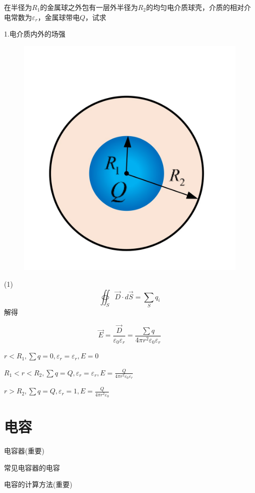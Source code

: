 \documentclass[lang=cn,10pt]{elegantbook}
\begin{document}
		\begin{example}
			在半径为$R_{1}$的金属球之外包有一层外半径为$R_{2}$的均匀电介质球壳，介质的相对介电常数为$\varepsilon_{r}$，金属球带电$Q$，试求
			
			1.电介质内外的场强
			
\begin{figure}[H]
	\centering
	\includegraphics[width=0.18\linewidth]{image/IMG_0418(20231118-125659)}
	\caption{}
	\label{fig:img041820231118-125659}
\end{figure}
		\end{example}
		 \begin{solution}
		 	
		 	(1)
		 	\begin{equation*}
		 		\oiint_S{\overrightarrow{D}\cdot d\overrightarrow{S}}=\sum_S{q_i}
		 	\end{equation*}
		 	解得
		 	
		 	\begin{equation*}
		 		\overrightarrow{E}=\frac{\overrightarrow{D}}{\varepsilon _0\varepsilon _r}=\frac{\sum{q}}{4\pi r^2\varepsilon _0\varepsilon _r}
		 	\end{equation*}
		 	
		 	$r<R_{1},\sum{q}=0,\varepsilon_{r}=\varepsilon_{r},E=0$
		 	
		 	$R_{1}<r<R_{2},\sum{q}=Q,\varepsilon_{r}=\varepsilon_{r},E=\frac{Q}{4\pi r^2\varepsilon _0\varepsilon _r}$
		 	
		 	$r>R_{2},\sum{q}=Q,\varepsilon_{r}=1,E=\frac{Q}{4\pi r^2\varepsilon _0}$
		 	
		 	
		 \end{solution}    
		\section{电容}
		\begin{introduction}
			\item 电容器(重要)
			\item 常见电容器的电容
			\item 电容的计算方法(重要)
		\end{introduction}
\end{document}
